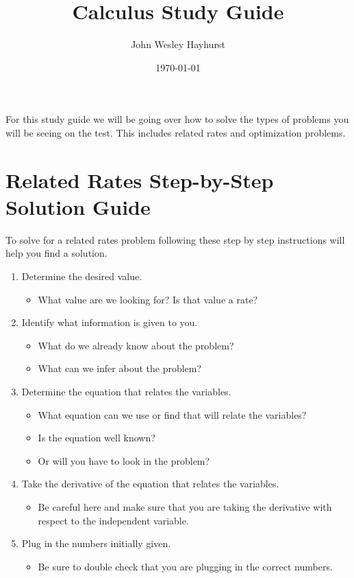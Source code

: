 \documentclass[12pt]{article}
\title{Calculus Study Guide}
\author{John Wesley Hayhurst}
\date{\today}
\begin{document}
  For this study guide we will be going over how to solve the types of problems you will be seeing on the test. This includes related rates and optimization problems.
  \section{Related Rates Step-by-Step Solution Guide}
    To solve for a related rates problem following these step by step instructions will help you find a solution.
    \begin{enumerate}
      \item Determine the desired value.
      \begin{itemize}
        \item What value are we looking for? Is that value a rate?
      \end{itemize}

      \item Identify what information is given to you.
      \begin{itemize}
        \item What do we already know about the problem?
        \item What can we infer about the problem?
      \end{itemize}

      \item Determine the equation that relates the variables.
      \begin{itemize}
        \item What equation can we use or find that will relate the variables?
        \item Is the equation well known?
        \item Or will you have to look in the problem?
      \end{itemize}

      \item Take the derivative of the equation that relates the variables.
      \begin{itemize}
        \item Be careful here and make sure that you are taking the derivative with respect to the independent variable.
      \end{itemize}

      \item Plug in the numbers initially given.
      \begin{itemize}
        \item Be sure to double check that you are plugging in the correct numbers.
      \end{itemize}


\end{enumerate}
\end{document}

